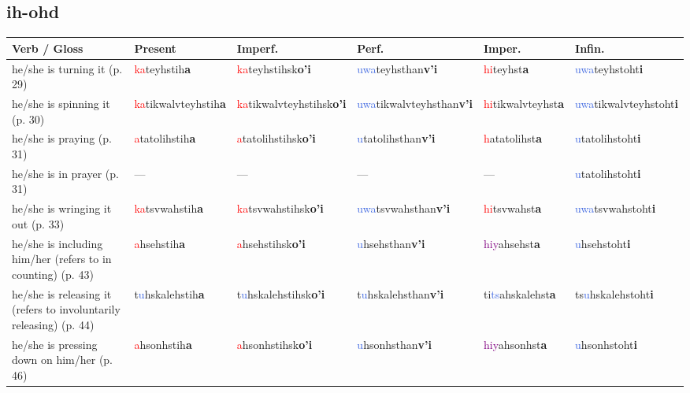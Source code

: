 \documentclass[oneside,openany]{book}%
\begin{document}
\subsection*{ih-ohd}%
\begin{tabularx}{\textwidth}{>{\hsize=1.5\hsize\RaggedRight}X >{\hsize=0.9\hsize}X >{\hsize=0.9\hsize}X >{\hsize=0.9\hsize}X >{\hsize=0.9\hsize}X >{\hsize=0.9\hsize}X}%
\toprule%
\textbf{Verb / Gloss}&\textbf{Present}&\textbf{Imperf.}&\textbf{Perf.}&\textbf{Imper.}&\textbf{Infin.}\\%
\midrule%
he/she is turning it (p. 29)&\textcolor{Red}{ka}teyhstih\textbf{a}&\textcolor{Red}{ka}teyhstihsk\textbf{o'i}&\textcolor{RoyalBlue}{uwa}teyhsthan\textbf{v'i}&\textcolor{Red}{hi}teyhst\textbf{a}&\textcolor{RoyalBlue}{uwa}teyhstoht\textbf{i}\\%
he/she is spinning it (p. 30)&\textcolor{Red}{ka}tikwalvteyhstih\textbf{a}&\textcolor{Red}{ka}tikwalvteyhstihsk\textbf{o'i}&\textcolor{RoyalBlue}{uwa}tikwalvteyhsthan\textbf{v'i}&\textcolor{Red}{hi}tikwalvteyhst\textbf{a}&\textcolor{RoyalBlue}{uwa}tikwalvteyhstoht\textbf{i}\\%
he/she is praying (p. 31)&\textcolor{Red}{a}tatolihstih\textbf{a}&\textcolor{Red}{a}tatolihstihsk\textbf{o'i}&\textcolor{RoyalBlue}{u}tatolihsthan\textbf{v'i}&\textcolor{Red}{h}atatolihst\textbf{a}&\textcolor{RoyalBlue}{u}tatolihstoht\textbf{i}\\%
he/she is in prayer (p. 31)&---&---&---&---&\textcolor{RoyalBlue}{u}tatolihstoht\textbf{i}\\%
he/she is wringing it out (p. 33)&\textcolor{Red}{ka}tsvwahstih\textbf{a}&\textcolor{Red}{ka}tsvwahstihsk\textbf{o'i}&\textcolor{RoyalBlue}{uwa}tsvwahsthan\textbf{v'i}&\textcolor{Red}{hi}tsvwahst\textbf{a}&\textcolor{RoyalBlue}{uwa}tsvwahstoht\textbf{i}\\%
he/she is including him/her (refers to in counting) (p. 43)&\textcolor{Red}{a}hsehstih\textbf{a}&\textcolor{Red}{a}hsehstihsk\textbf{o'i}&\textcolor{RoyalBlue}{u}hsehsthan\textbf{v'i}&\textcolor{Purple}{hiy}ahsehst\textbf{a}&\textcolor{RoyalBlue}{u}hsehstoht\textbf{i}\\%
he/she is releasing it (refers to involuntarily releasing) (p. 44)&t\textcolor{RoyalBlue}{u}hskalehstih\textbf{a}&t\textcolor{RoyalBlue}{u}hskalehstihsk\textbf{o'i}&t\textcolor{RoyalBlue}{u}hskalehsthan\textbf{v'i}&ti\textcolor{RoyalBlue}{ts}ahskalehst\textbf{a}&ts\textcolor{RoyalBlue}{u}hskalehstoht\textbf{i}\\%
he/she is pressing down on him/her (p. 46)&\textcolor{Red}{a}hsonhstih\textbf{a}&\textcolor{Red}{a}hsonhstihsk\textbf{o'i}&\textcolor{RoyalBlue}{u}hsonhsthan\textbf{v'i}&\textcolor{Purple}{hiy}ahsonhst\textbf{a}&\textcolor{RoyalBlue}{u}hsonhstoht\textbf{i}\\%

\end{tabularx}
\end{document}

